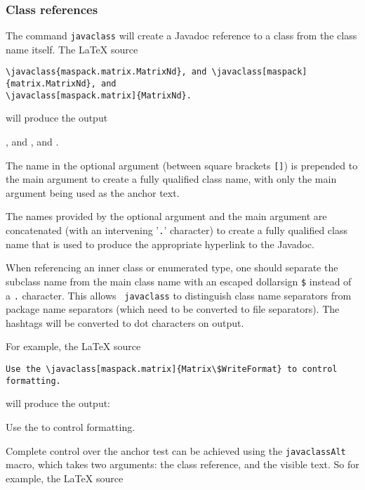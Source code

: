\documentclass{article}
\begin{document}
\subsubsection{Class references}
\label{ClassRefsSec}

The command {\tt \BKS javaclass} will create a Javadoc reference to 
a class from the class name itself. The LaTeX source

\begin{lstlisting}[]
\javaclass{maspack.matrix.MatrixNd}, and \javaclass[maspack]{matrix.MatrixNd}, and
\javaclass[maspack.matrix]{MatrixNd}.
\end{lstlisting}

will produce the output

, and , and
.

The name in the optional argument (between square brackets {\tt []})
is prepended to the main argument to create a fully qualified class name,
with only the main argument being used as the anchor text. 

The names provided by the optional argument and the main argument are
concatenated (with an intervening '{\tt .}' character) to create a
fully qualified class name that is used to produce the appropriate
hyperlink to the Javadoc. 

When referencing an inner class or enumerated type, one should
separate the subclass name from the main class name with an escaped
dollarsign {\tt \$} instead of a {\tt .} character. This allows {\tt \BKS
javaclass} to distinguish class name separators from package name
separators (which need to be converted to file separators). The
hashtags will be converted to dot characters on output.

For example, the LaTeX source 

\begin{lstlisting}[]
Use the \javaclass[maspack.matrix]{Matrix\$WriteFormat} to control formatting.
\end{lstlisting}

will produce the output:

Use the  to control formatting.

Complete control over the anchor test can be
achieved using the {\tt \BKS javaclassAlt} macro, which takes two
arguments: the class reference, and the visible text. So for example,
the LaTeX source
\end{document}
